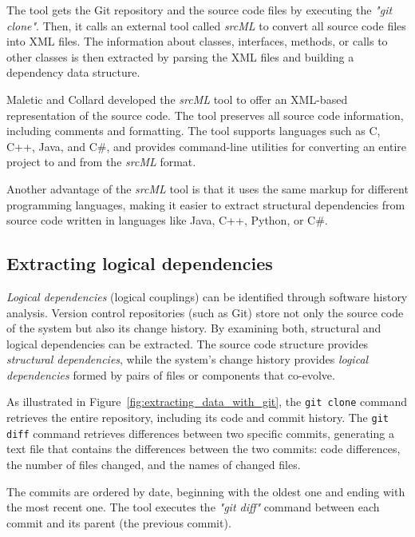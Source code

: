 The tool gets the Git repository and the source code files by executing the \textit{"git clone"}. Then, it calls an external tool called \textit{srcML} \cite{srcML} to convert all source code files into XML files. The information about classes, interfaces, methods, or calls to other classes is then extracted by parsing the XML files and building a dependency data structure.

Maletic and Collard \cite{srcMLCollard, Collard:2011:LTF:2067850.2068011, CollardsrcML2005} developed the \textit{srcML} tool to offer an XML-based representation of the source code. The tool preserves all source code information, including comments and formatting. The tool supports languages such as C, C++, Java, and C\#, and provides command-line utilities for converting an entire project to and from the \textit{srcML} format. 

Another advantage of the \textit{srcML} tool is that it uses the same markup for different programming languages, making it easier to extract structural dependencies from source code written in languages like Java, C++, Python, or C\#.



\subsection{Extracting logical dependencies}
\label{subsec:extracting_logical_dependencies}

\hspace{4em}\textit{Logical dependencies} (logical couplings) can be identified through software history analysis. Version control repositories (such as Git) store not only the source code of the system but also its change history. By examining both, structural and logical dependencies can be extracted. The source code structure provides \textit{structural dependencies}, while the system’s change history provides \textit{logical dependencies} formed by pairs of files or components that co-evolve.

As illustrated in Figure~\ref{fig:extracting_data_with_git}, the \texttt{git clone} command retrieves the entire repository, including its code and commit history. The \texttt{git diff} command retrieves differences between two specific commits, generating a text file that contains the differences between the two commits: code differences, the number of files changed, and the names of changed files.

The commits are ordered by date, beginning with the oldest one and ending with the most recent one. The tool executes the \textit{"git diff"} command between each commit and its parent (the previous commit). 

